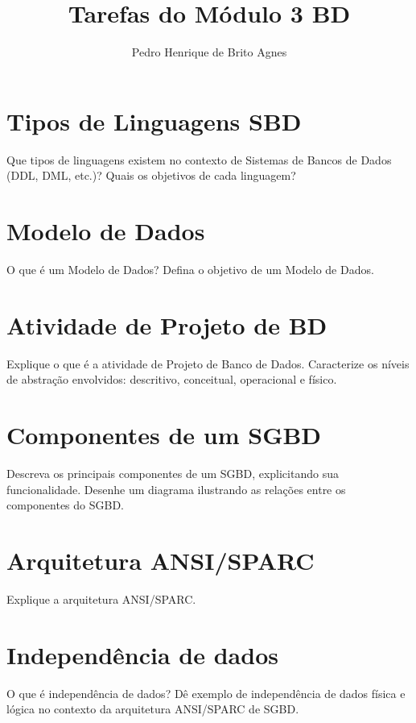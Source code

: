 \documentclass[12pt]{article}
\begin{document}
\title{Tarefas do Módulo 3 BD}
\author{Pedro Henrique de Brito Agnes}

\maketitle

\setcounter{section}{14}
\section{Tipos de Linguagens SBD}
Que tipos de linguagens existem no contexto de Sistemas de Bancos de Dados (DDL, DML, etc.)? Quais os objetivos de cada linguagem?

\section{Modelo de Dados}
O que é um Modelo de Dados? Defina o objetivo de um Modelo de Dados.

\section{Atividade de Projeto de BD}
Explique o que é a atividade de Projeto de Banco de Dados. Caracterize os níveis de abstração envolvidos: descritivo, conceitual, operacional e físico.

\section{Componentes de um SGBD}
Descreva os principais componentes de um SGBD, explicitando sua funcionalidade. Desenhe um diagrama ilustrando as relações entre os componentes do SGBD.

\section{Arquitetura ANSI/SPARC}
Explique a arquitetura ANSI/SPARC.

\section{Independência de dados}
O que é independência de dados? Dê exemplo de independência de dados física e lógica no contexto da arquitetura ANSI/SPARC de SGBD.
\end{document}

